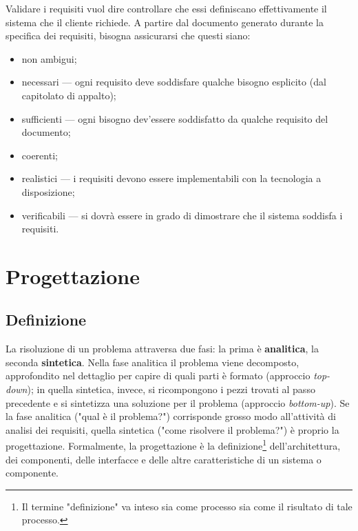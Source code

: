 \documentclass[a4paper]{article}
\begin{document}
		
Validare i requisiti vuol dire controllare che essi definiscano effettivamente il sistema che il cliente richiede. A partire dal documento generato durante la specifica dei requisiti, bisogna assicurarsi che questi siano:
		
	\begin{itemize}
		
			
	\item non ambigui;
			
	\item necessari --- ogni requisito deve soddisfare qualche bisogno esplicito (dal capitolato di appalto);
			
	\item sufficienti --- ogni bisogno dev'essere soddisfatto da qualche requisito del documento;
			
	\item coerenti;
			
	\item realistici --- i requisiti devono essere implementabili con la tecnologia a disposizione;
			
	\item verificabili --- si dovrà essere in grado di dimostrare che il sistema soddisfa i requisiti.
		
	\end{itemize}

	


		
	\section{Progettazione}


		
	\subsection{Definizione}

		
La risoluzione di un problema attraversa due fasi: la prima è \textbf{analitica}, la seconda \textbf{sintetica}. Nella fase analitica il problema viene decomposto, approfondito nel dettaglio per capire di quali parti è formato (approccio \emph{top-down}); in quella sintetica, invece, si ricompongono i pezzi trovati al passo precedente e si sintetizza una soluzione per il problema (approccio \emph{bottom-up}). Se la fase analitica ("qual è il problema?") corrisponde grosso modo all'attività di analisi dei requisiti, quella sintetica ("come risolvere il problema?") è proprio la progettazione. Formalmente, la progettazione è la definizione\footnote{Il termine "definizione" va inteso sia come processo sia come il risultato di tale processo.} dell'architettura, dei componenti, delle interfacce e delle altre caratteristiche di un sistema o componente.
		
\end{document}
